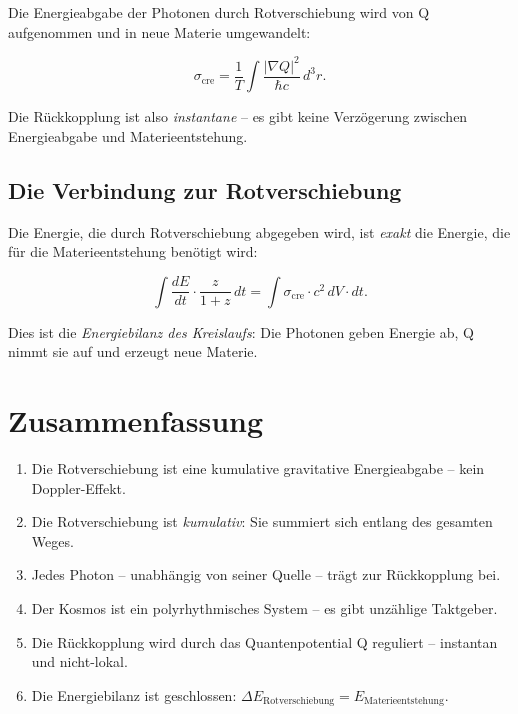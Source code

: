 Die Energieabgabe der Photonen durch Rotverschiebung wird von Q aufgenommen und in neue Materie umgewandelt:

\begin{equation}
\sigma_{\text{cre}} = \frac{1}{T} \int \frac{|\nabla Q|^2}{\hbar c} \, d^3r. \tag{4.5}
\end{equation}

Die Rückkopplung ist also \emph{instantane} – es gibt keine Verzögerung zwischen Energieabgabe und Materieentstehung.

\subsection{Die Verbindung zur Rotverschiebung}

Die Energie, die durch Rotverschiebung abgegeben wird, ist \emph{exakt} die Energie, die für die Materieentstehung benötigt wird:

\begin{equation}
\int \frac{dE}{dt} \cdot \frac{z}{1+z} \, dt = \int \sigma_{\text{cre}} \cdot c^2 \, dV \cdot dt. \tag{4.6}
\end{equation}

Dies ist die \emph{Energiebilanz des Kreislaufs}: Die Photonen geben Energie ab, Q nimmt sie auf und erzeugt neue Materie.

\section{Zusammenfassung}

\begin{enumerate}
    \item Die Rotverschiebung ist eine kumulative gravitative Energieabgabe – kein Doppler-Effekt.
    \item Die Rotverschiebung ist \emph{kumulativ}: Sie summiert sich entlang des gesamten Weges.
    \item Jedes Photon – unabhängig von seiner Quelle – trägt zur Rückkopplung bei.
    \item Der Kosmos ist ein polyrhythmisches System – es gibt unzählige Taktgeber.
    \item Die Rückkopplung wird durch das Quantenpotential Q reguliert – instantan und nicht-lokal.
    \item Die Energiebilanz ist geschlossen: \(\Delta E_{\text{Rotverschiebung}} = E_{\text{Materieentstehung}}\).
\end{enumerate}
